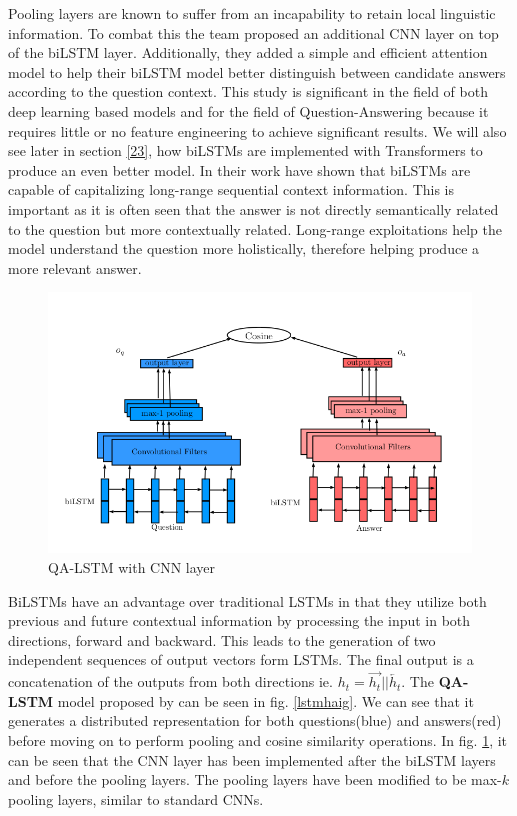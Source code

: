 \documentclass[a4paper,12pt]{report}
\begin{document}
            Pooling layers are known to suffer from an incapability to retain local linguistic information. To combat this the team proposed an additional CNN layer on top of the biLSTM layer. Additionally, they added a simple and efficient attention model to help their biLSTM model better distinguish between candidate answers according to the question context. This study is significant in the field of both deep learning based models and for the field of Question-Answering because it requires little or no feature engineering to achieve significant results. We will also see later in section \ref{23}, how biLSTMs are implemented with Transformers to produce an even better model.
            In their work \citep{lstmhaighextractive} have shown that biLSTMs are capable of capitalizing long-range sequential context information. This is important as it is often seen that the answer is not directly semantically related to the question but more contextually related. Long-range exploitations help the model understand the question more holistically, therefore helping produce a more relevant answer.


		   \begin{figure}
				\centering
				\includegraphics[scale=0.35]{../images/lstm-bilstmhaigcnn.png}
				\caption{QA-LSTM with CNN layer \citep{lstmhaighextractive}}\label{lstmhaigcnn}
			\end{figure}

             BiLSTMs have an advantage over traditional LSTMs in that they utilize both previous and future contextual information by processing the input in both directions, forward and backward. This leads to the generation of two independent sequences of output vectors form LSTMs. The final output is a concatenation  of the outputs from both directions ie. $h_t= \overrightarrow{h_t} || \overleftarrow{h_t} $.
             The \textbf{QA-LSTM} model  proposed by \citep{lstmhaighextractive} can be seen in fig. \ref{lstmhaig}. We can see that it generates a distributed representation for both questions(blue) and answers(red) before moving on to perform pooling and cosine similarity operations.
            In fig. \ref{lstmhaigcnn}, it can be seen that the CNN layer has been implemented after the biLSTM layers and before the pooling layers. The pooling layers have been modified to be max-$ k $ pooling layers, similar to standard CNNs.
\end{document}
